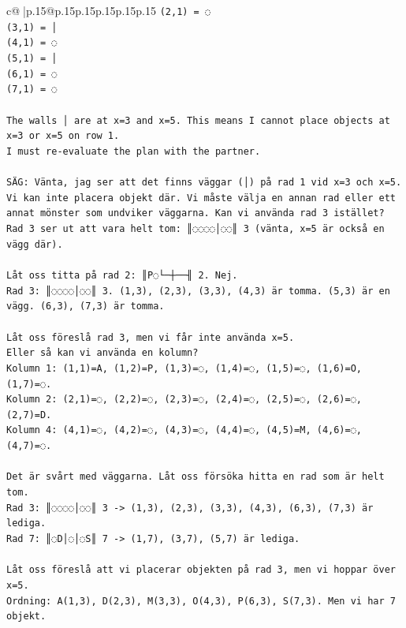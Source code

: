 \documentclass{article}
\begin{document}
{\begin{supertabular}{c@{$\;$}|p{.15\linewidth}@{}p{.15\linewidth}p{.15\linewidth}p{.15\linewidth}p{.15\linewidth}p{.15\linewidth}}
{{{\texttt{(2,1) = ◌} \\
\texttt{(3,1) = │} \\
\texttt{(4,1) = ◌} \\
\texttt{(5,1) = │} \\
\texttt{(6,1) = ◌} \\
\texttt{(7,1) = ◌} \\
\\ 
\texttt{The walls │ are at x=3 and x=5. This means I cannot place objects at x=3 or x=5 on row 1.} \\
\texttt{I must re{-}evaluate the plan with the partner.} \\
\\ 
\texttt{SÄG: Vänta, jag ser att det finns väggar (│) på rad 1 vid x=3 och x=5. Vi kan inte placera objekt där. Vi måste välja en annan rad eller ett annat mönster som undviker väggarna. Kan vi använda rad 3 istället? Rad 3 ser ut att vara helt tom: ║◌◌◌◌│◌◌║ 3 (vänta, x=5 är också en vägg där).} \\
\\ 
\texttt{Låt oss titta på rad 2: ║P◌└─┼──╢ 2. Nej.} \\
\texttt{Rad 3: ║◌◌◌◌│◌◌║ 3. (1,3), (2,3), (3,3), (4,3) är tomma. (5,3) är en vägg. (6,3), (7,3) är tomma.} \\
\\ 
\texttt{Låt oss föreslå rad 3, men vi får inte använda x=5.} \\
\texttt{Eller så kan vi använda en kolumn?} \\
\texttt{Kolumn 1: (1,1)=A, (1,2)=P, (1,3)=◌, (1,4)=◌, (1,5)=◌, (1,6)=O, (1,7)=◌.} \\
\texttt{Kolumn 2: (2,1)=◌, (2,2)=◌, (2,3)=◌, (2,4)=◌, (2,5)=◌, (2,6)=◌, (2,7)=D.} \\
\texttt{Kolumn 4: (4,1)=◌, (4,2)=◌, (4,3)=◌, (4,4)=◌, (4,5)=M, (4,6)=◌, (4,7)=◌.} \\
\\ 
\texttt{Det är svårt med väggarna. Låt oss försöka hitta en rad som är helt tom.} \\
\texttt{Rad 3: ║◌◌◌◌│◌◌║ 3 {-}> (1,3), (2,3), (3,3), (4,3), (6,3), (7,3) är lediga.} \\
\texttt{Rad 7: ║◌D│◌│◌S║ 7 {-}> (1,7), (3,7), (5,7) är lediga.} \\
\\ 
\texttt{Låt oss föreslå att vi placerar objekten på rad 3, men vi hoppar över x=5.} \\
\texttt{Ordning: A(1,3), D(2,3), M(3,3), O(4,3), P(6,3), S(7,3). Men vi har 7 objekt.} \\
}}}
\end{supertabular}}
\end{document}
